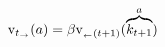   \begin{equation}\begin{gathered}\begin{aligned}
        \mathrm{v}_{t_\rightarrow}(a) & = \beta \mathrm{v}_{_\leftarrow{(t+1)}}(\overbrace{k_{t+1}}^{a}) \label{eq:vEndtdefn}
      \end{aligned}\end{gathered}\end{equation}
